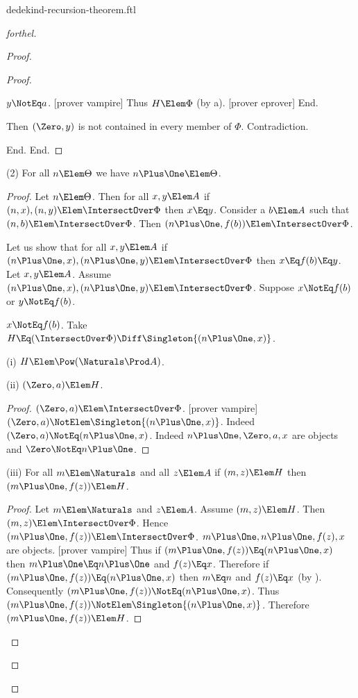 \documentclass{stex}
\begin{document}
\begin{smodule}{dedekind-recursion-theorem.ftl}
\begin{proof}[forthel]
\begin{proof}
\begin{proof}
\begin{case}{$y \NotEq a$.}
              [prover vampire]
              Thus $H \Elem \Phi$ (by a).
              [prover eprover]
            End.

            Then $(\Zero,y)$ is not contained in every member of $\Phi$.
            Contradiction.
          \end{case}
        End.
      End.
    \end{proof}

    (2) For all $n \Elem \Theta$ we have $n \Plus \One \Elem \Theta$.
    \begin{proof}
      Let $n \Elem \Theta$.
      Then for all $x, y \Elem A$ if $(n, x), (n, y) \Elem \IntersectOver \Phi$ then
      $x \Eq y$.
      Consider a $b \Elem A$ such that $(n,b) \Elem \IntersectOver \Phi$.
      Then $(n \Plus \One, f(b)) \Elem \IntersectOver \Phi$.

      Let us show that for all $x, y \Elem A$ if $(n \Plus \One, x),
      (n \Plus \One, y) \Elem \IntersectOver \Phi$ then $x \Eq f(b) \Eq y$.
        Let $x, y \Elem A$.
        Assume $(n \Plus \One, x), (n \Plus \One, y) \Elem \IntersectOver \Phi$.
        Suppose $x \NotEq f(b)$ or $y \NotEq f(b)$.

        \begin{case}{$x \NotEq f(b)$.}
          Take $H \Eq (\IntersectOver \Phi) \Diff \Singleton{(n \Plus \One,x)}$.

          (i) $H \Elem \Pow(\Naturals \Prod A)$.

          (ii) $(\Zero,a) \Elem H$.
          \begin{proof}
            $(\Zero,a) \Elem \IntersectOver \Phi$.
            [prover vampire]
            $(\Zero,a) \NotElem \Singleton{(n \Plus \One,x)}$.
            Indeed $(\Zero,a) \NotEq (n \Plus \One,x)$.
            Indeed $n \Plus \One, \Zero, a, x$ are objects and $\Zero \NotEq n \Plus \One$.
          \end{proof}

          (iii) For all $m \Elem \Naturals$ and all $z \Elem A$ if $(m,z) \Elem H$ then $(m \Plus \One,f(z)) \Elem H$.
          \begin{proof}
            Let $m \Elem \Naturals$ and $z \Elem A$.
            Assume $(m,z) \Elem H$.
            Then $(m,z) \Elem \IntersectOver \Phi$.
            Hence $(m \Plus \One,f(z)) \Elem \IntersectOver \Phi$.
            $m \Plus \One, n \Plus \One, f(z), x$ are objects.
            [prover vampire]
            Thus if $(m \Plus \One,f(z)) \Eq (n \Plus \One,x)$ then $m \Plus \One \Eq n \Plus \One$ and $f(z) \Eq x$.
            Therefore if $(m \Plus \One,f(z)) \Eq (n \Plus \One,x)$ then $m \Eq n$ and $f(z) \Eq x$ (by ).
            Consequently $(m \Plus \One,f(z)) \NotEq (n \Plus \One,x)$.
            Thus $(m \Plus \One,f(z)) \NotElem \Singleton{(n \Plus \One,x)}$.
            Therefore $(m \Plus \One,f(z)) \Elem H$.
          \end{proof}


\end{case}
\end{proof}
\end{proof}
\end{proof}
\end{smodule}
\end{document}
